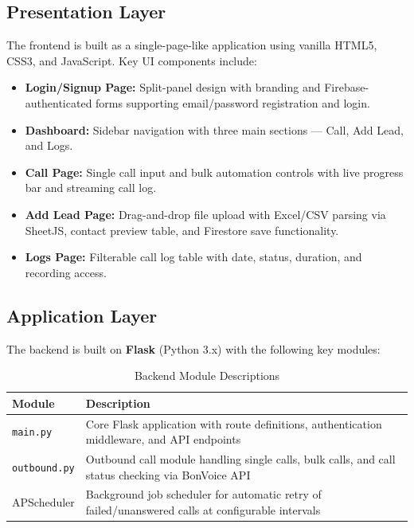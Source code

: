 \documentclass[12pt,a4paper,oneside]{book}
\begin{document}
\subsection{Presentation Layer}

The frontend is built as a single-page-like application using vanilla HTML5, CSS3, and JavaScript. Key UI components include:

\begin{itemize}
    \item \textbf{Login/Signup Page:} Split-panel design with branding and Firebase-authenticated forms supporting email/password registration and login.
    \item \textbf{Dashboard:} Sidebar navigation with three main sections --- Call, Add Lead, and Logs.
    \item \textbf{Call Page:} Single call input and bulk automation controls with live progress bar and streaming call log.
    \item \textbf{Add Lead Page:} Drag-and-drop file upload with Excel/CSV parsing via SheetJS, contact preview table, and Firestore save functionality.
    \item \textbf{Logs Page:} Filterable call log table with date, status, duration, and recording access.
\end{itemize}

\subsection{Application Layer}

The backend is built on \textbf{Flask} (Python 3.x) with the following key modules:

\begin{table}[H]
\centering
\caption{Backend Module Descriptions}
\label{tab:modules}
\begin{tabularx}{\textwidth}{|l|X|}
\hline
\textbf{Module} & \textbf{Description} \\
\hline
\texttt{main.py} & Core Flask application with route definitions, authentication middleware, and API endpoints \\
\hline
\texttt{outbound.py} & Outbound call module handling single calls, bulk calls, and call status checking via BonVoice API \\
\hline
APScheduler & Background job scheduler for automatic retry of failed/unanswered calls at configurable intervals \\
\hline
\end{tabularx}
\end{table}
\end{document}
